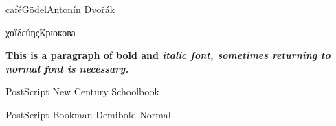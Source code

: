 \documentclass[UTF8]{article}
\begin{document}
café\quad Gödel\quad Antonín Dvořák

χαϊδεύης\qquad Крюкова

\sffamily
\textbf{This is a paragraph of bold and
\textit{italic font, sometimes returning
to \textnormal{normal font} is necessary.}}

\fontsize{14}{17}\selectfont
PostScript New Century Schoolbook

PostScript Bookman Demibold Normal\check{}
\end{document}
